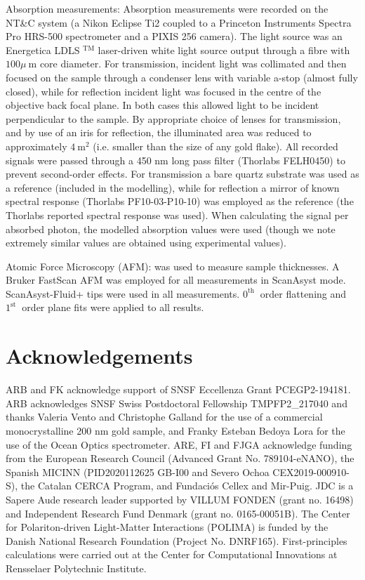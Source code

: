 \documentclass[10pt]{article}
\begin{document}
Absorption measurements: Absorption measurements were recorded on the NT\&C system (a Nikon Eclipse Ti2 coupled to a Princeton Instruments Spectra Pro HRS-500 spectrometer and a PIXIS 256 camera). The light source was an Energetica LDLS ${ }^{\mathrm{TM}}$ laser-driven white light source output through a fibre with $100 \mu \mathrm{~m}$ core diameter. For transmission, incident light was collimated and then focused on the sample through a condenser lens with variable a-stop (almost fully closed), while for reflection incident light was focused in the centre of the objective back focal plane. In both cases this allowed light to be incident perpendicular to the sample. By appropriate choice of lenses for transmission, and by use of an iris for reflection, the illuminated area was reduced to approximately $4 \mathrm{~m}^{2}$ (i.e. smaller than the size of any gold flake). All recorded signals were passed through a 450 nm long pass filter (Thorlabs FELH0450) to prevent second-order effects. For transmission a bare quartz substrate was used as a reference (included in the modelling), while for reflection a mirror of known spectral response (Thorlabs PF10-03-P10-10) was employed as the reference (the Thorlabs reported spectral response was used). When calculating the signal per absorbed photon, the modelled absorption values were used (though we note extremely similar values are obtained using experimental values).

Atomic Force Microscopy (AFM): was used to measure sample thicknesses. A Bruker FastScan AFM was employed for all measurements in ScanAsyst mode. ScanAsyst-Fluid+ tips were used in all measurements. $0^{\text {th }}$ order flattening and $1^{\text {st }}$ order plane fits were applied to all results.

\section*{Acknowledgements}
ARB and FK acknowledge support of SNSF Eccellenza Grant PCEGP2-194181. ARB acknowledges SNSF Swiss Postdoctoral Fellowship TMPFP2\_217040 and thanks Valeria Vento and Christophe Galland for the use of a commercial monocrystalline 200 nm gold sample, and Franky Esteban Bedoya Lora for the use of the Ocean Optics spectrometer. ARE, FI and FJGA acknowledge funding from the European Research Council (Advanced Grant No. 789104-eNANO), the Spanish MICINN (PID2020112625 GB-I00 and Severo Ochoa CEX2019-000910-S), the Catalan CERCA Program, and Fundaciós Cellex and Mir-Puig. JDC is a Sapere Aude research leader supported by VILLUM FONDEN (grant no. 16498) and Independent Research Fund Denmark (grant no. 0165-00051B). The Center for Polariton-driven Light-Matter Interactions (POLIMA) is funded by the Danish National Research Foundation (Project No. DNRF165). First-principles calculations were carried out at the Center for Computational Innovations at Rensselaer Polytechnic Institute.
\end{document}
